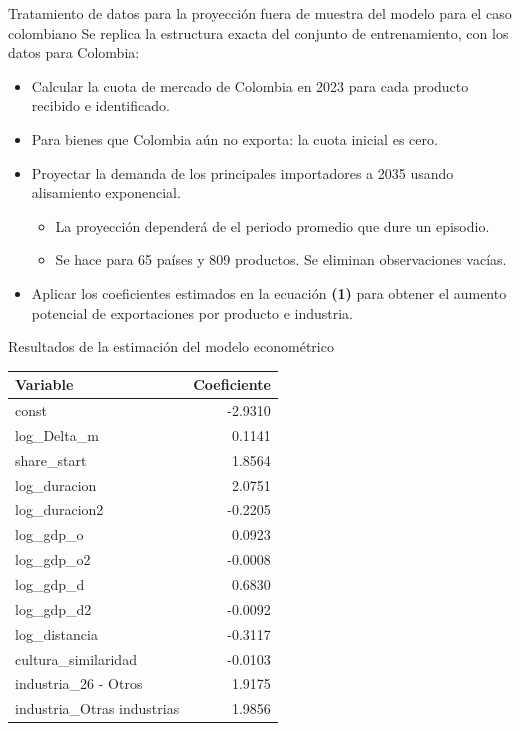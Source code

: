 \documentclass[aspectratio=169,xcolor=dvipsnames]{beamer}
\begin{document}
\begin{frame}{Tratamiento de datos para la proyección fuera de muestra del modelo para el caso colombiano}
Se replica la estructura exacta del conjunto de entrenamiento, con los datos para Colombia:
  \begin{itemize}
    \item Calcular la cuota de mercado de Colombia en 2023 para cada producto recibido e identificado.
    \item Para bienes que Colombia aún no exporta: la cuota inicial es cero.
    \item Proyectar la demanda de los principales importadores a 2035 usando alisamiento exponencial.
    \begin{itemize}
        \item La proyección dependerá de el periodo promedio que dure un episodio. 
        \item Se hace para 65 países y 809 productos. Se eliminan observaciones vacías.
    \end{itemize}
    \item Aplicar los coeficientes estimados en la ecuación \textbf{(1)} para obtener el aumento potencial de exportaciones por producto e industria.
  \end{itemize}
\end{frame}

\begin{frame}{Resultados de la estimación del modelo econométrico}
    \begin{center}
        \scriptsize
        \begin{tabular}{lr}
        \toprule
        Variable & Coeficiente \\
        \midrule
        const & -2.9310 \\
        log\_Delta\_m & 0.1141 \\
        share\_start & 1.8564 \\
        log\_duracion & 2.0751 \\
        log\_duracion2 & -0.2205 \\
        log\_gdp\_o & 0.0923 \\
        log\_gdp\_o2 & -0.0008 \\
        log\_gdp\_d & 0.6830 \\
        log\_gdp\_d2 & -0.0092 \\
        log\_distancia & -0.3117 \\
        cultura\_similaridad & -0.0103 \\
        industria\_26 - Otros & 1.9175 \\
        industria\_Otras industrias & 1.9856 \\
        \bottomrule
        \end{tabular}
    \end{center}
\end{frame}
\end{document}
